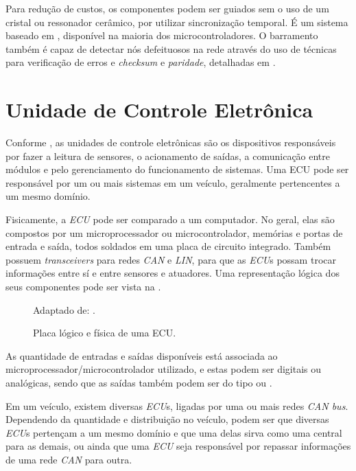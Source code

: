Para redução de custos, os componentes podem ser guiados sem o uso de um cristal ou ressonador cerâmico, por utilizar sincronização temporal. É um sistema baseado em , disponível na maioria dos microcontroladores. O barramento também é capaz de detectar nós defeituosos na rede através do uso de técnicas para verificação de erros e \emph{checksum} e \emph{paridade}, detalhadas em .

\section{Unidade de Controle Eletrônica}
\label{cap:ecu}

Conforme , as unidades de controle eletrônicas são os dispositivos responsáveis por fazer a leitura de sensores, o acionamento de saídas, a comunicação entre módulos e pelo gerenciamento do funcionamento de sistemas. Uma ECU pode ser responsável por um ou mais sistemas em um veículo, geralmente pertencentes a um mesmo domínio.

Fisicamente, a \emph{ECU} pode ser comparado a um computador. No geral, elas são compostos por um microprocessador ou microcontrolador, memórias e portas de entrada e saída, todos soldados em uma placa de circuito integrado. Também possuem \emph{transceivers} para redes \emph{CAN} e \emph{LIN}, para que as \emph{ECU}s possam trocar informações entre sí e entre sensores e atuadores. Uma representação lógica dos seus componentes pode ser vista na .

\begin{figure}[htb]
	\centering
	\caption{Placa lógico e física de uma ECU.}
	Adaptado de: .
	\label{fig:cap2_ecu_image}
\end{figure}

As quantidade de entradas e saídas disponíveis está associada ao microprocessador/microcontrolador utilizado, e estas podem ser digitais ou analógicas, sendo que as saídas também podem ser do tipo  ou .

Em um veículo, existem diversas \emph{ECU}s, ligadas por uma ou mais redes \emph{CAN bus}. Dependendo da quantidade e distribuição no veículo, podem ser que diversas \emph{ECU}s pertençam a um mesmo domínio e que uma delas sirva como uma central para as demais, ou ainda que uma \emph{ECU} seja responsável por repassar informações de uma rede \emph{CAN} para outra.

